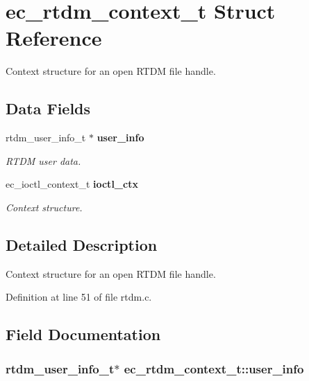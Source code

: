 \section{ec\-\_\-rtdm\-\_\-context\-\_\-t Struct Reference}
\label{structec__rtdm__context__t}


Context structure for an open R\-T\-D\-M file handle.  


\subsection*{Data Fields}
\begin{DoxyCompactItemize}
\item 
rtdm\-\_\-user\-\_\-info\-\_\-t $\ast$ {\bf user\-\_\-info}
\begin{DoxyCompactList}\small\item\em R\-T\-D\-M user data. \end{DoxyCompactList}\item 
ec\-\_\-ioctl\-\_\-context\-\_\-t {\bf ioctl\-\_\-ctx}
\begin{DoxyCompactList}\small\item\em Context structure. \end{DoxyCompactList}\end{DoxyCompactItemize}


\subsection{Detailed Description}
Context structure for an open R\-T\-D\-M file handle. 

Definition at line 51 of file rtdm.\-c.



\subsection{Field Documentation}
\subsubsection[{user\-\_\-info}]{\setlength{\rightskip}{0pt plus 5cm}rtdm\-\_\-user\-\_\-info\-\_\-t$\ast$ ec\-\_\-rtdm\-\_\-context\-\_\-t\-::user\-\_\-info}\label{structec__rtdm__context__t_a062a354a243cbc0dddbfd9f440a68135}


